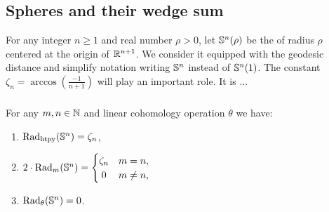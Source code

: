
\subsection{Spheres and their wedge sum }\label{ss:Sn}\label{sub:Sn and wedge sum}

For any integer $n \geq 1$ and real number $\rho > 0$, let $\mathbb{S}^n(\rho)$ be the  of radius $\rho$ centered at the origin of $\mathbb{R}^{n+1}$.
We consider it equipped with the geodesic distance and simplify notation writing \(\mathbb{S}^n\) instead of \(\mathbb{S}^n(1)\).
The constant \(\zeta_n = \arccos(\tfrac{-1}{n+1})\) will play an important role.
It is ... 

\subsubsection{}\label{subsub:critical values of Sn}

\medskip\proposition
For any $m,n \in \mathbb{N}$ and linear cohomology operation $\theta$ we have:
\begin{enumerate}
	\item \(\mathrm{Rad}_{\mathrm{htpy}}(\mathbb{S}^n) = \zeta_n\),
	\item \(2\cdot\firstdeath{m}{\bS^n} =
	\begin{cases}
		\zeta_n & m = n, \\
		\hfil 0 & m \neq n,
	\end{cases}\)
	\item \(\mathrm{Rad}_{\theta}(\mathbb{S}^n) = 0\).
\end{enumerate}

